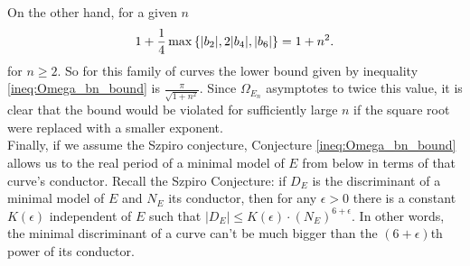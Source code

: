 \documentclass[10pt]{article}
\begin{document}
On the other hand, for a given $n$
\begin{equation}
1+\frac{1}{4}\max\left\{|b_2|,2|b_4|,|b_6|\right\} = 1+n^2.
\end{equation}
for $n\ge 2$. So for this family of curves the lower bound given by inequality \ref{ineq:Omega_bn_bound} is $\frac{\pi}{\sqrt{1+n^2}}$. Since $\Omega_{E_n}$ asymptotes to twice this value, it is clear that the bound would be violated for sufficiently large $n$ if the square root were replaced with a smaller exponent. \\

Finally, if we assume the Szpiro conjecture, Conjecture \ref{ineq:Omega_bn_bound} allows us to the real period of a minimal model of $E$ from below in terms of that curve's conductor. Recall the Szpiro Conjecture: if $D_E$ is the discriminant of a minimal model of $E$ and $N_E$ its conductor, then for any $\epsilon>0$ there is a constant $K(\epsilon)$ independent of $E$ such that $|D_E| \le K(\epsilon)\cdot (N_E)^{6+\epsilon}$.  In other words, the minimal discriminant of a curve can't be much bigger than the $(6+\epsilon)$th power of its conductor.
\end{document}
